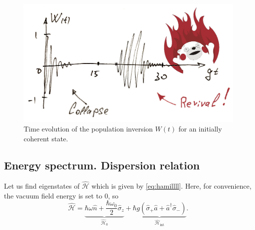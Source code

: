 \begin{figure}
	\centering
	\includegraphics[width=0.7\linewidth]{fig/L6/c_and_r.jpg}
	\caption{Time evolution of the population inversion $W(t)$ for an initially coherent state.}
	\label{fig:candr}
\end{figure}


\subsection{Energy spectrum. Dispersion relation}

Let us find eigenstates of $\hat{\mathscr{H}}$ which is given by \eqref{eq:hamillll}. Here, for convenience, the vacuum field energy is set to $0$, so
\begin{equation}
	\hat{\mathscr{H}} = \underbrace{\hbar \omega  \hat{n} + \frac{\hbar \omega_0}{2} \hat{\sigma}_z}_{\hat{\mathscr{H}}_0} + \underbrace{\hbar g \left( \hat{\sigma}_+\hat{a} + \hat{a}^{\dagger} \hat{\sigma}_- \right)}_{\hat{\mathscr{H}}_{\text{int}}}.
\end{equation}

